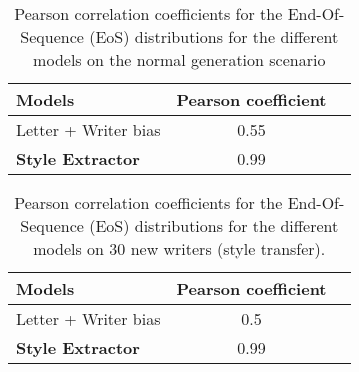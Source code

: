 \documentclass[conference]{IEEEtran}
\begin{document}

\begin{table}[!htbp]
\centering
\begin{tabular}{|l|c|c|}
\hline
Models & Pearson coefficient\\ \hline
Letter + Writer bias & 0.55\\ \hline
\textbf{Style Extractor} & 0.99 \\ \hline
\end{tabular}
\caption{Pearson correlation coefficients for the End-Of-Sequence (EoS) distributions for the different models on the normal generation scenario}
\label{table:EoS_gen}
\end{table}


\begin{table}[!htbp]
\centering
\begin{tabular}{|l|c|c|}
\hline
Models & Pearson coefficient\\ \hline
Letter + Writer bias & 0.5\\ \hline
\textbf{Style Extractor} & 0.99\\ \hline
\end{tabular}
\caption{Pearson correlation coefficients for the End-Of-Sequence (EoS) distributions for the different models on 30 new writers (style transfer).}
\label{table:EoS_transfer}
\end{table}
\end{document}
